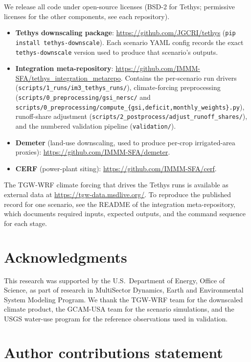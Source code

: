 \documentclass[fleqn,10pt]{wlscirep}
\begin{document}
We release all code under open-source licenses (BSD-2 for Tethys; permissive licenses for the other components, see each repository).
\begin{itemize}
    \item \textbf{Tethys downscaling package}: \url{https://github.com/JGCRI/tethys} (\texttt{pip install tethys-downscale}). Each scenario YAML config records the exact \texttt{tethys-downscale} version used to produce that scenario's outputs.
    \item \textbf{Integration meta-repository}: \url{https://github.com/IMMM-SFA/tethys_integration_metarepo}. Contains the per-scenario run drivers (\texttt{scripts/1\_runs/im3\_tethys\_runs/}), climate-forcing preprocessing (\texttt{scripts/0\_preprocessing/gsi\_nersc/} and \texttt{scripts/0\_preprocessing/compute\_\{gsi,deficit,monthly\_weights\}.py}), runoff-share adjustment (\texttt{scripts/2\_postprocess/adjust\_runoff\_shares/}), and the numbered validation pipeline (\texttt{validation/}).
    \item \textbf{Demeter} (land-use downscaling, used to produce per-crop irrigated-area proxies): \url{https://github.com/IMMM-SFA/demeter}\cite{Vernon-2018}.
    \item \textbf{CERF} (power-plant siting): \url{https://github.com/IMMM-SFA/cerf}\cite{Vernon2021}.
\end{itemize}
The TGW-WRF climate forcing\cite{Jones2023TGW} that drives the Tethys runs is available as external data at \url{https://tgw-data.msdlive.org/}. To reproduce the published record for one scenario, see the README of the integration meta-repository, which documents required inputs, expected outputs, and the command sequence for each stage.

\section*{Acknowledgments}

This research was supported by the U.S.~Department of Energy, Office of Science, as part of research in MultiSector Dynamics, Earth and Environmental System Modeling Program. We thank the TGW-WRF team for the downscaled climate product, the GCAM-USA team for the scenario simulations, and the USGS water-use program for the reference observations used in validation.

\section*{Author contributions statement}
\end{document}
